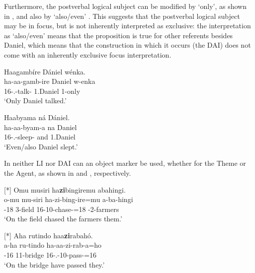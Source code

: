 \documentclass[output=paper]{langscibook}
\begin{document}
\z

Furthermore, the postverbal logical subject can be modified by ‘only’, as shown in , and also by ‘also/even’ . This suggests that the postverbal logical subject may be in focus, but is not inherently interpreted as exclusive: the interpretation as ‘also/even’ means that the proposition is true for other referents besides Daniel, which means that the construction in which it occurs (the DAI) does not come with an inherently exclusive focus interpretation.

\ea
\label{bkm:Ref111455511}
Haagambíre Dániel wénka.\\
\gll
ha-aa-gamb-ire  Daniel  w-enka\\
16\SM{}-\N{}.\PST{}-talk-\PFV{}  1.Daniel  1-only\\
\glt
‘Only Daniel talked.’\\


\z

\ea
\label{bkm:Ref111455562}
Haabyama ná Dániel.\\
\gll
ha-aa-byam-a  na  Daniel\\
16\SM{}-\N{}.\PST{}-{}sleep-\FV{}  and  1.Daniel\\
\glt
‘Even/also Daniel slept.’\\


\z

In neither LI nor DAI can an object marker be used, whether for the Theme or the Agent, as shown in  and , respectively.

\ea
[*]{
\label{bkm:Ref111455934}
Omu musiri ha\textbf{zi}bingiremu abahingi.\\
\gll
o-mu  mu-siri  ha-zi-bing-ire=mu  a-ba-hingi\\
\AUG{}-18  3-field  16\SM{}-10\OM{}-chase-\PFV{}=18  \AUG{}-2-farmers\\
\glt
‘On the field chased the farmers them.’\\
}


\z

\ea
[*]{
\label{bkm:Ref111455935}
Aha rutindo haa\textbf{zi}rabahó.\\
\gll
a-ha  ru-tindo  ha-aa-zi-rab-a=ho\\
\AUG{}-16  11-bridge  16\SM{}-\N{}.\PST{}-10\OM{}-pass-\FV{}=16\\
\glt
‘On the bridge have passed they.’\\
}
\end{document}
